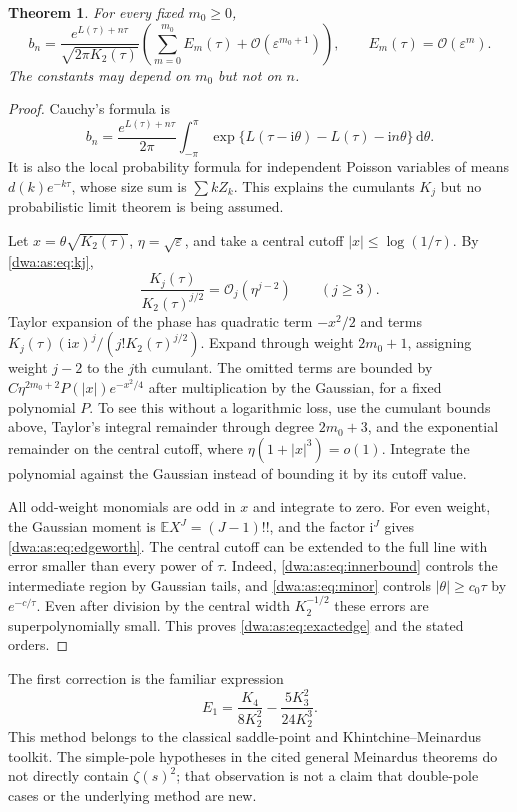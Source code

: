 \documentclass[11pt,letterpaper]{article}
\numberwithin{equation}{section}
\newtheorem{theorem}{Theorem}[section]
\theoremstyle{remark}
\newcommand{\dd}{\mathrm d}
\newcommand{\ii}{\mathrm i}
\newcommand{\E}{\mathbb E}
\newcommand{\OO}{\mathcal O}
\begin{document}
\begin{theorem}\label{dwa:as:thm:edgeworth}
For every fixed $m_0\ge0$,
\begin{equation}\label{dwa:as:eq:exactedge}
 b_n=\frac{e^{L(\tau)+n\tau}}{\sqrt{2\pi K_2(\tau)}}
 \left(\sum_{m=0}^{m_0}E_m(\tau)+\OO(\varepsilon^{m_0+1})\right),
 \qquad E_m(\tau)=\OO(\varepsilon^m).
\end{equation}
The constants may depend on $m_0$ but not on $n$.
\end{theorem}
\begin{proof}
Cauchy's formula is
\[
 b_n=\frac{e^{L(\tau)+n\tau}}{2\pi}
 \int_{-\pi}^{\pi}\exp\{L(\tau-\ii\theta)-L(\tau)-\ii n\theta\}\,\dd\theta.
\]
It is also the local probability formula for independent Poisson variables of means $d(k)e^{-k\tau}$, whose size sum is $\sum kZ_k$. This explains the cumulants $K_j$ but no probabilistic limit theorem is being assumed.

Let $x=\theta\sqrt{K_2(\tau)}$, $\eta=\sqrt\varepsilon$, and take a central cutoff $|x|\le\log(1/\tau)$. By \eqref{dwa:as:eq:kj},
\[
 \frac{K_j(\tau)}{K_2(\tau)^{j/2}}=\OO_j(\eta^{j-2})\qquad(j\ge3).
\]
Taylor expansion of the phase has quadratic term $-x^2/2$ and terms
$K_j(\tau)(\ii x)^j/(j!K_2(\tau)^{j/2})$. Expand through weight $2m_0+1$, assigning weight $j-2$ to the $j$th cumulant. The omitted terms are bounded by
$C\eta^{2m_0+2}P(|x|)e^{-x^2/4}$ after multiplication by the Gaussian, for a fixed polynomial $P$. To see this without a logarithmic loss, use the cumulant bounds above, Taylor's integral remainder through degree $2m_0+3$, and the exponential remainder on the central cutoff, where $\eta(1+|x|^3)=o(1)$. Integrate the polynomial against the Gaussian instead of bounding it by its cutoff value.

All odd-weight monomials are odd in $x$ and integrate to zero. For even weight, the Gaussian moment is $\E X^J=(J-1)!!$, and the factor $\ii^J$ gives \eqref{dwa:as:eq:edgeworth}. The central cutoff can be extended to the full line with error smaller than every power of $\tau$. Indeed, \eqref{dwa:as:eq:innerbound} controls the intermediate region by Gaussian tails, and \eqref{dwa:as:eq:minor} controls $|\theta|\ge c_0\tau$ by $e^{-c/\tau}$. Even after division by the central width $K_2^{-1/2}$ these errors are superpolynomially small. This proves \eqref{dwa:as:eq:exactedge} and the stated orders.
\end{proof}
The first correction is the familiar expression
\[
 E_1=\frac{K_4}{8K_2^2}-\frac{5K_3^2}{24K_2^3}.
\]
This method belongs to the classical saddle-point and Khintchine--Meinardus toolkit. The simple-pole hypotheses in the cited general Meinardus theorems \cite{GSE,GS} do not directly contain $\zeta(s)^2$; that observation is not a claim that double-pole cases or the underlying method are new.
\end{document}
